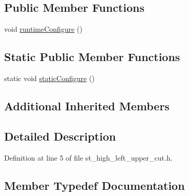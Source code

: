 \subsection*{Public Member Functions}
\begin{DoxyCompactItemize}
\item 
void \hyperlink{structsm__moveit__3_1_1StHighLeftUpperCut_a7e6c9b36cd6246271da8ae42bf35e9ad}{runtime\+Configure} ()
\end{DoxyCompactItemize}
\subsection*{Static Public Member Functions}
\begin{DoxyCompactItemize}
\item 
static void \hyperlink{structsm__moveit__3_1_1StHighLeftUpperCut_aaf9012145bc27cf9f87f88f524a4a20a}{static\+Configure} ()
\end{DoxyCompactItemize}
\subsection*{Additional Inherited Members}


\subsection{Detailed Description}


Definition at line 5 of file st\+\_\+high\+\_\+left\+\_\+upper\+\_\+cut.\+h.



\subsection{Member Typedef Documentation}
\mbox{\label{structsm__moveit__3_1_1StHighLeftUpperCut_a26a27ee4a7e89a86f60919e51ef9a51b}} 
